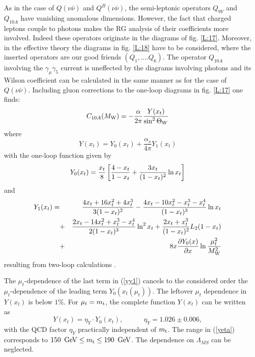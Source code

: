 \documentclass[12pt]{article}
\def\as{\alpha_s}
\newcommand{\mt}{m_{\rm t}}
\newcommand{\mw}{M_{\rm W}}
\newcommand{\gev}{\, {\rm GeV}}
\newcommand{\be}{\begin{equation}}
\newcommand{\ee}{\end{equation}}
\def\aspi{\frac{\as}{4\pi}}
\begin{document}
\begin{itemize}
\begin{itemize}
As in the case of $Q(\nu\bar\nu)$ and $Q^B(\nu\bar\nu)$, the semi-leptonic
operators $Q_{9V}$ and $Q_{10A}$ have vanishing anomalous dimensions.
However, the fact that charged leptons couple to photons makes the
RG analysis of their coefficients more involved. Indeed these operators
originate in the diagrams of fig. \ref{L:17}. 
Moreover, in the effective theory
the diagrams in fig. \ref{L:18} have to be considered, 
where the inserted operators
are our good friends $(Q_1,....Q_6)$. The operator $Q_{10A}$ involving the
$\gamma_\mu\gamma_5$ current is uneffected by the diagrams involving
photons and its Wilson coefficient can be calculated in the same manner as
for the case of $Q(\nu\bar\nu)$. Including gluon corrections to the
one-loop diagrams in fig. \ref{L:17} one finds:
\be
C_{10A}(\mw)=-\frac{\alpha}{2\pi}\frac{Y(x_t)}{\sin^2\Theta_W}
\ee
where
\begin{equation}\label{yy}
Y(x_t) = Y_0(x_t) + \aspi Y_1(x_t)\end{equation}
with the one-loop function given by \cite{IL}
\begin{equation}\label{yy0}
Y_0(x_t) = {x_t\over 8}
\left[{4-x_t\over 1-x_t}+{3x_t\over (1-x_t)^2}\ln x_t\right]
\end{equation}
and 
\begin{eqnarray}\label{yy1}
Y_1(x_t) = &&{4x_t + 16 x_t^2 + 4x_t^3 \over 3(1-x_t)^2} -
     {4x_t - 10x_t^2-x_t^3-x_t^4\over (1-x_t)^3} \ln x_t\nonumber\\
     &+&{2x_t - 14x_t^2 + x_t^3 - x_t^4\over 2(1-x_t)^3} \ln^2 x_t
           + {2x_t + x_t^3\over (1-x_t)^2} L_2(1-x_t)\nonumber\\
         &+&8x {\partial Y_0(x) \over \partial x} 
          \ln\frac{\mu_t^2}{\mw^2} 
\end{eqnarray}
resulting from two-loop calculations \cite{BB2}.
 
The $\mu_t$-dependence of the last term in (\ref{yy1}) cancels to the
considered order the $\mu_t$-dependence of the leading term 
$Y_0(x_t(\mu_t))$.
The leftover $\mu_t$ dependence in $Y(x_t)$ is below $1\%$.
For $\mu_t=\mt$, the complete function $Y(x_t)$ can  be written as
\begin{equation}\label{yeta}
Y(x_t)=\eta_Y\cdot Y_0(x_t), \qquad\quad \eta_Y=1.026\pm0.006,
\end{equation}
with the QCD factor $\eta_Y$
practically independent of $\mt$. The range in (\ref{yeta}) corresponds
to $150~\gev\le\mt\le 190~\gev$. The dependence on 
$\Lambda_{\overline{MS}}$ can be neglected.


\end{itemize}
\end{itemize}
\end{document}
